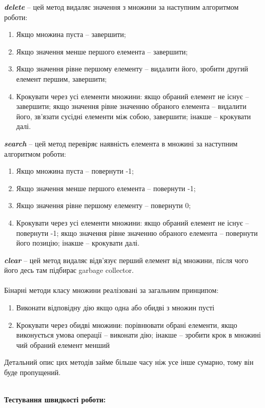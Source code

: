 \documentclass{article}
\begin{document}
\textbf{\textit{delete}} -- цей метод видаляє значення з множини за наступним алгоритмом роботи:
\begin{enumerate}
\item Якщо множина пуста -- завершити;
\item Якщо значення менше першого елемента -- завершити;
\item Якщо значення рівне першому елементу -- видалити його, зробити другий елемент першим, завершити;
\item Крокувати через усі елементи множини: якщо обраний елемент не існує -- завершити; якщо значення рівне значенню обраного елемента -- видалити його, зв'язати сусідні елементи між собою, завершити; інакше -- крокувати далі.
\end{enumerate}\indent

\textbf{\textit{search}} -- цей метод перевіряє наявність елемента в множині за наступним алгоритмом роботи:
\begin{enumerate}
\item Якщо множина пуста -- повернути -1;
\item Якщо значення менше першого елемента -- повернути -1;
\item Якщо значення рівне першому елементу -- повернути 0;
\item Крокувати через усі елементи множини: якщо обраний елемент не існує -- повернути -1; якщо значення рівне значенню обраного елемента -- повернути його позицію; інакше -- крокувати далі.
\end{enumerate}\indent

\textbf{\textit{clear}} -- цей метод видаляє відв'язує перший елемент від множини, після чого його десь там підбирає garbage collector.\\\\\indent
Бінарні методи класу множини реалізовані за загальним принципом:
\begin{enumerate}
\item Виконати відповідну дію якщо одна або обидві з множин пусті
\item Крокувати через обидві множини: порівнювати обрані елементи, якщо виконується умова операції -- виконати дію; інакше -- зробити крок в множині чий обраний елемент менший
\end{enumerate}
Детальний опис цих методів займе більше часу ніж усе інше сумарно, тому він буде пропущений.
\\\\\indent

\pagebreak
\textbf{Тестування швидкості роботи:}
\\\indent
\end{document}
